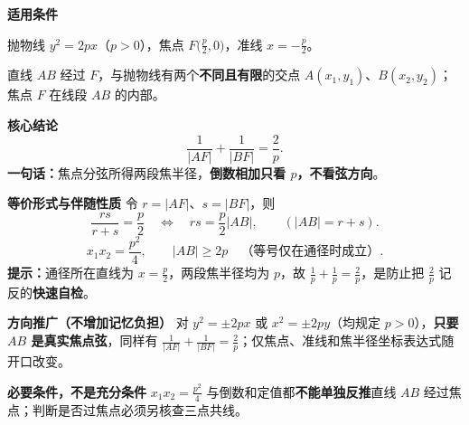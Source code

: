 \begin{statementbox}
\textbf{\textcolor{CStatement}{适用条件}}
\begin{description}[style=nextline,leftmargin=2.8em,labelsep=0.5em,itemsep=0.35em]
  \item[\textbf{条件 1（方程）：}] 抛物线 $y^2=2px$（$p>0$），焦点 $F\bigl(\frac p2,0\bigr)$，准线 $x=-\frac p2$。
  \item[\textbf{条件 2（真正的焦点弦）：}] 直线 $AB$ 经过 $F$，与抛物线有两个\textbf{不同且有限}的交点 $A(x_1,y_1)$、$B(x_2,y_2)$；焦点 $F$ 在线段 $AB$ 的内部。
\end{description}
\medskip
\textbf{\textcolor{CStatement}{核心结论}}
\[
 \boxed{\frac1{|AF|}+\frac1{|BF|}=\frac2p.}
\]
\textbf{一句话：}焦点分弦所得两段焦半径，\textbf{倒数相加只看 $p$，不看弦方向}。

\begin{center}\end{center}
\end{statementbox}
\clearpage
\begin{statementbox}
\medskip
\textbf{\textcolor{CStatement}{等价形式与伴随性质}}
令 $r=|AF|$、$s=|BF|$，则
\[
 \boxed{\frac{rs}{r+s}=\frac p2}
 \quad\Longleftrightarrow\quad
 \boxed{rs=\frac p2|AB|},\qquad (|AB|=r+s).
\]
\[
 \boxed{x_1x_2=\frac{p^2}{4}},\qquad
 \boxed{|AB|\ge 2p}\quad\text{（等号仅在通径时成立）}.
\]
\textbf{提示：}通径所在直线为 $x=\frac p2$，两段焦半径均为 $p$，故 $\frac1p+\frac1p=\frac2p$，是防止把 $\frac2p$ 记反的\textbf{快速自检}。

\medskip
\textbf{\textcolor{CStatement}{方向推广（不增加记忆负担）}}
对 $y^2=\pm2px$ 或 $x^2=\pm2py$（均规定 $p>0$），\textbf{只要 $AB$ 是真实焦点弦}，同样有 $\frac1{|AF|}+\frac1{|BF|}=\frac2p$；仅焦点、准线和焦半径坐标表达式随开口改变。

\medskip
\textbf{\textcolor{CStatement}{必要条件，不是充分条件}}
$x_1x_2=\frac{p^2}{4}$ 与倒数和定值都\textbf{不能单独反推}直线 $AB$ 经过焦点；判断是否过焦点必须另核查三点共线。
\end{statementbox}
